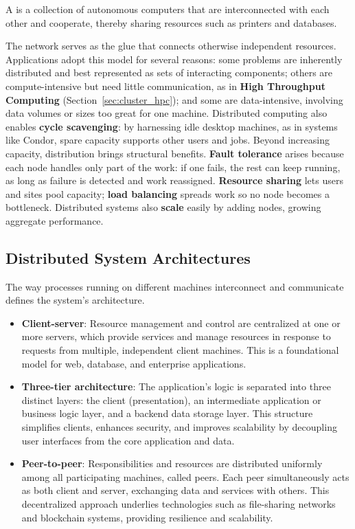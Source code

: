 \begin{definitionblock}
A  is a collection of autonomous computers that are interconnected with each other and cooperate, thereby sharing resources such as printers and databases.
\end{definitionblock}

The network serves as the glue that connects otherwise independent resources. Applications adopt this model for several reasons: some problems are inherently distributed and best represented as sets of interacting components; others are compute-intensive but need little communication, as in \textbf{High Throughput Computing} (Section~\ref{sec:cluster_hpc}); and some are data-intensive, involving data volumes or sizes too great for one machine. Distributed computing also enables \textbf{cycle scavenging}: by harnessing idle desktop machines, as in systems like Condor, spare capacity supports other users and jobs. Beyond increasing capacity, distribution brings structural benefits. \textbf{Fault tolerance} arises because each node handles only part of the work: if one fails, the rest can keep running, as long as failure is detected and work reassigned. \textbf{Resource sharing} lets users and sites pool capacity; \textbf{load balancing} spreads work so no node becomes a bottleneck. Distributed systems also \textbf{scale} easily by adding nodes, growing aggregate performance.

\subsection{Distributed System Architectures}

The way processes running on different machines interconnect and communicate defines the system's architecture.

\begin{itemize}
    \item \textbf{Client-server}: Resource management and control are centralized at one or more servers, which provide services and manage resources in response to requests from multiple, independent client machines. This is a foundational model for web, database, and enterprise applications.
    \item \textbf{Three-tier architecture}: The application's logic is separated into three distinct layers: the client (presentation), an intermediate application or business logic layer, and a backend data storage layer. This structure simplifies clients, enhances security, and improves scalability by decoupling user interfaces from the core application and data.
    \item \textbf{Peer-to-peer}: Responsibilities and resources are distributed uniformly among all participating machines, called peers. Each peer simultaneously acts as both client and server, exchanging data and services with others. This decentralized approach underlies technologies such as file-sharing networks and blockchain systems, providing resilience and scalability.
\end{itemize}

